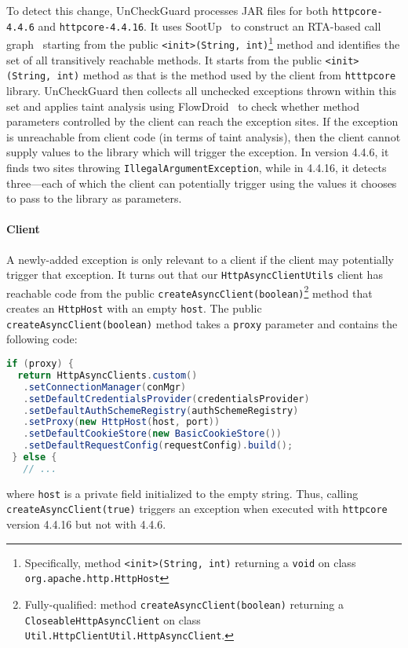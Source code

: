 To detect this change, UnCheckGuard processes JAR files for both \texttt{httpcore-4.4.6} and \texttt{httpcore-4.4.16}. It uses SootUp~\cite{Karakaya24:_sootup} to construct an RTA-based call graph~\cite{bacon96:_fast_static_analy_c_virtual_funct_calls} starting from the public \texttt{<init>(String, int)}\footnote{Specifically, method \texttt{<init>(String, int)} returning a \texttt{void} on class \texttt{org.apache.http.HttpHost}} method and identifies the set of all transitively reachable methods. It starts from the public \texttt{<init>(String, int)} method as that is the method used by the client from \texttt{htttpcore} library. UnCheckGuard then collects all unchecked exceptions thrown within this set and applies taint analysis using FlowDroid~\cite{Arzt14:_flowdroid} to check whether method parameters controlled by the client can reach the exception sites. If the exception is unreachable from client code (in terms of taint analysis), then the client cannot supply values to the library which will trigger the exception. In version 4.4.6, it finds two sites throwing \texttt{IllegalArgumentException}, while in 4.4.16, it detects three—each of which the client can potentially trigger using the values it chooses to pass to the library as parameters.

\paragraph{Client} 
A newly-added exception is only relevant to a client if the client may
potentially trigger that exception.  It turns out that
our \texttt{HttpAsyncClientUtils} client has reachable code from the public \texttt{createAsyncClient(boolean)}\footnote{Fully-qualified: method \texttt{createAsyncClient(boolean)} returning a \texttt{CloseableHttpAsyncClient} on class \texttt{Util.HttpClientUtil.HttpAsyncClient}.} method
that creates an \texttt{HttpHost} with an empty \texttt{host}. The
public \texttt{createAsyncClient(boolean)} method takes a \texttt{proxy}
parameter and contains the following code:
\begin{lstlisting}[language=Java,basicstyle=\scriptsize\ttfamily]
 if (proxy) {
  return HttpAsyncClients.custom()
   .setConnectionManager(conMgr)
   .setDefaultCredentialsProvider(credentialsProvider)
   .setDefaultAuthSchemeRegistry(authSchemeRegistry)
   .setProxy(new HttpHost(host, port))
   .setDefaultCookieStore(new BasicCookieStore())
   .setDefaultRequestConfig(requestConfig).build();
 } else {
   // ...
\end{lstlisting}
where \texttt{host} is a private field initialized to the empty string.
Thus, calling \texttt{createAsyncClient(true)} triggers an exception when executed with
\texttt{httpcore} version 4.4.16 but not with 4.4.6.

